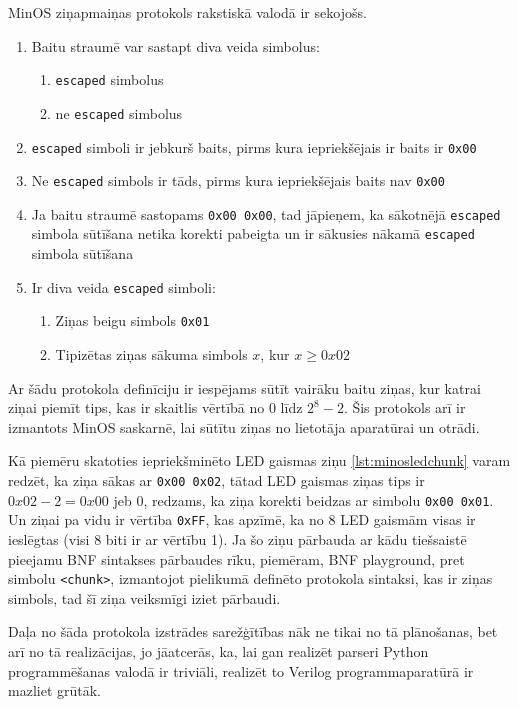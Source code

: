 MinOS ziņapmaiņas protokols rakstiskā valodā ir sekojošs.
\begin{enumerate}
    \item Baitu straumē var sastapt diva veida simbolus:
    \begin{enumerate}
        \item \lstinline!escaped! simbolus
        \item ne \lstinline!escaped! simbolus
    \end{enumerate}
    \item \lstinline!escaped! simboli ir jebkurš baits, pirms kura iepriekšējais ir baits ir \lstinline!0x00!
    \item Ne \lstinline!escaped! simbols ir tāds, pirms kura iepriekšējais baits nav \lstinline!0x00!
    \item Ja baitu straumē sastopams \lstinline!0x00 0x00!, tad jāpieņem, ka
        sākotnējā \lstinline!escaped! simbola sūtīšana netika korekti pabeigta
        un ir sākusies nākamā \lstinline!escaped! simbola sūtīšana
    \item Ir diva veida \lstinline!escaped! simboli: 
    \begin{enumerate}
        \item Ziņas beigu simbols \lstinline!0x01!
        \item Tipizētas ziņas sākuma simbols \(x\), kur \(x\geq0x02\)
    \end{enumerate}
\end{enumerate}

Ar šādu protokola definīciju ir iespējams sūtīt vairāku baitu ziņas, kur katrai
ziņai piemīt tips, kas ir skaitlis vērtībā no \(0\) līdz \(2^8-2\). Šis
protokols arī ir izmantots MinOS saskarnē, lai sūtītu ziņas no lietotāja
aparatūrai un otrādi. 

Kā piemēru skatoties iepriekšminēto LED gaismas ziņu \ref{lst:minosledchunk}
varam redzēt, ka ziņa sākas ar \lstinline!0x00 0x02!, tātad LED gaismas ziņas
tips ir \(0x02 - 2 = 0x00\) jeb \(0\), redzams, ka ziņa korekti beidzas ar
simbolu \lstinline!0x00 0x01!. Un ziņai pa vidu ir vērtība \lstinline!0xFF!, kas
apzīmē, ka no 8 LED gaismām visas ir ieslēgtas (visi 8 biti ir ar vērtību 1). Ja
šo ziņu pārbauda ar kādu tiešsaistē pieejamu BNF sintakses pārbaudes rīku,
piemēram, BNF playground, \cite{BNFPlayground} pret simbolu \lstinline!<chunk>!,
izmantojot pielikumā definēto protokola sintaksi, kas ir ziņas simbols, tad šī
ziņa veiksmīgi iziet pārbaudi.

Daļa no šāda protokola izstrādes sarežģītības nāk ne tikai no tā plānošanas, bet
arī no tā realizācijas, jo jāatcerās, ka, lai gan realizēt parseri Python
programmēšanas valodā ir triviāli, realizēt to Verilog programmaparatūrā ir
mazliet grūtāk.

